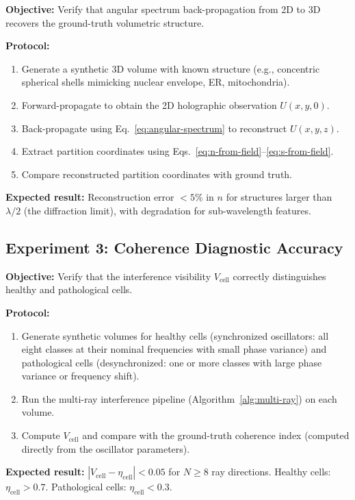 \documentclass[11pt,twocolumn,a4paper]{article}
\newcommand{\etacell}{\eta_{\mathrm{cell}}}
\newcommand{\Vcell}{V_{\mathrm{cell}}}
\begin{document}
\textbf{Objective:} Verify that angular spectrum back-propagation from
2D to 3D recovers the ground-truth volumetric structure.

\textbf{Protocol:}
\begin{enumerate}[label=(\roman*),leftmargin=*]
\item Generate a synthetic 3D volume with known structure (e.g.,
  concentric spherical shells mimicking nuclear envelope, ER,
  mitochondria).
\item Forward-propagate to obtain the 2D holographic observation
  $U(x,y,0)$.
\item Back-propagate using Eq.~\eqref{eq:angular-spectrum} to
  reconstruct $U(x,y,z)$.
\item Extract partition coordinates using
  Eqs.~\eqref{eq:n-from-field}--\eqref{eq:s-from-field}.
\item Compare reconstructed partition coordinates with ground truth.
\end{enumerate}

\textbf{Expected result:} Reconstruction error $< 5\%$ in $n$ for
structures larger than $\lambda/2$ (the diffraction limit), with
degradation for sub-wavelength features.

\subsection{Experiment 3: Coherence Diagnostic Accuracy}

\textbf{Objective:} Verify that the interference visibility $\Vcell$
correctly distinguishes healthy and pathological cells.

\textbf{Protocol:}
\begin{enumerate}[label=(\roman*),leftmargin=*]
\item Generate synthetic volumes for healthy cells (synchronized
  oscillators: all eight classes at their nominal frequencies with
  small phase variance) and pathological cells (desynchronized:
  one or more classes with large phase variance or frequency shift).
\item Run the multi-ray interference pipeline
  (Algorithm~\ref{alg:multi-ray}) on each volume.
\item Compute $\Vcell$ and compare with the ground-truth coherence
  index (computed directly from the oscillator parameters).
\end{enumerate}

\textbf{Expected result:} $|\Vcell - \etacell| < 0.05$ for $N \geq 8$
ray directions. Healthy cells: $\etacell > 0.7$. Pathological cells:
$\etacell < 0.3$.
\end{document}
